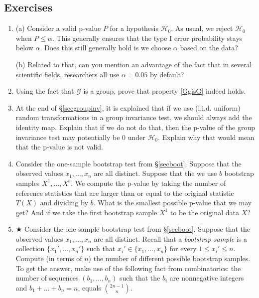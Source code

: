 \documentclass[11pt]{article}
\theoremstyle{plain}
\theoremstyle{definition}
\newcommand{\G}{\mathcal{G}}
\newcommand{\Hy}{\mathcal{H}}
\begin{document}
\subsection{Exercises}
\begin{enumerate}
\item 
(a) Consider a valid p-value $P$ for a hypothesis $\Hy_0$. As usual, we reject $\Hy_0$ when $P\leq \alpha$. This generally ensures that the type I error probability stays below $\alpha$. Does this still generally hold is we choose $\alpha$ based on the data?

(b) Related to that, can you mention an advantage of the fact that in several scientific fields, researchers all use  $\alpha=0.05$ by default?

\item Using the fact that $\G$ is a group, prove that property \eqref{GgisG} indeed holds.
\item At the end of \S\ref{secgroupinv}, it is explained that if we use (i.i.d. uniform) random transformations in a group invariance test, we should always add the identity map. Explain that if we do not do that, then the p-value of the group invariance test may potentially be 0 under $\Hy_0$. Explain why that would mean that the p-value is not valid.
\item Consider the one-sample bootstrap test from \S\ref{secboot}. Suppose that the observed values $x_1,...,x_n$ are all distinct. Suppose that the we use $b$ bootstrap samples $X^1,...,X^b$.  We compute the p-value  by taking the number of reference statistics that are larger than or equal to the original statistic $T(X)$ and dividing by $b$. What is the smallest possible p-value that we may get? And if we take the first bootstrap sample $X^1$ to be the original data $X$?





\item $\bigstar$ Consider the one-sample bootstrap test from \S\ref{secboot}. Suppose that the observed values $x_1,...,x_n$ are all distinct. Recall that a \emph{bootstrap sample} is a collection $\{x_1',...,x_n'\}$ such that   $x_i'\in\{x_1,...,x_n\}$ for every $1\leq x_i' \leq n$. Compute (in terms of $n$) the number of different possible bootstrap samples.
To get the answer, make use of  the following fact from combinatorics: the number of sequences $(b_1,...,b_n)$ such that the $b_i$ are nonnegative integers and $b_1+...+b_n=n$, equals  $\binom{2n-1}{n}.$ 


\end{enumerate}
\end{document}
